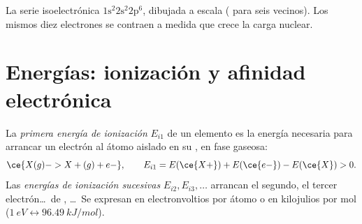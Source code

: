 \begin{omfigure}

{\small La serie isoelectrónica $1\text{s}^2 2\text{s}^2 2\text{p}^6$,
dibujada a escala ( para seis vecinos). Los mismos diez
electrones se contraen a medida que crece la carga nuclear.}
\end{omfigure}

\section{Energías: ionización y afinidad electrónica}

\begin{definition}\label{def:b1:periodicity:ionisation-energy}
La \emph{primera energía de ionización} $E_{i1}$
de un elemento es la energía necesaria para arrancar un electrón al
átomo aislado en su , en fase gaseosa:
\[
  \ce{X(g) -> X+(g) + e-}, \qquad E_{i1} = E(\ce{X+}) + E(\ce{e-}) - E(\ce{X}) > 0 .
\]
Las \emph{energías de ionización sucesivas}
$E_{i2}, E_{i3}, \dots$ arrancan el segundo, el tercer
electrón\dots\ de , \dots\ Se expresan en
electronvoltios por átomo o en kilojulios por mol
($\qty{1}{eV} \leftrightarrow \qty{96.49}{kJ/mol}$).
\end{definition}

